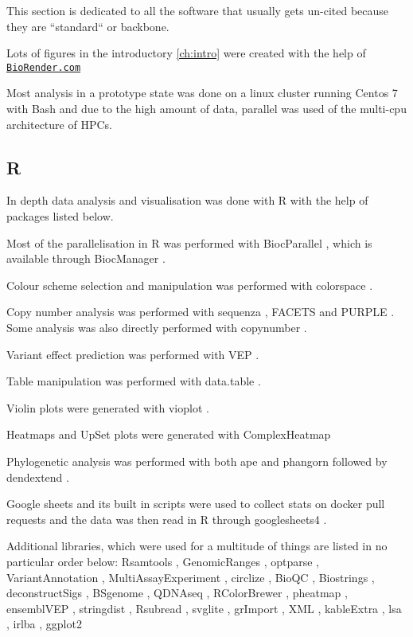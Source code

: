 {This section is dedicated to all the software that usually gets un-cited because they are ``standard`` or backbone.

Lots of figures in the introductory \autoref{ch:intro} were created with the help of \href{https://BioRender.com}{\nolinkurl{BioRender.com}} 


Most analysis in a prototype state was done on a linux cluster running Centos 7 \cite{CentosProject2014} with Bash \cite{FSF2007} and due to the high amount of data, parallel \cite{Tange2011} was used of the multi-cpu architecture of HPCs.

\subsection*{R}
In depth data analysis and visualisation was done with R \cite{RCT2021} with the help of packages listed below.


Most of the parallelisation in R was performed with BiocParallel \cite{Morgan2020}, which is available through BiocManager \cite{Morgan2019}.

Colour scheme selection and manipulation was performed with colorspace \cite{Zeileis2009,Zeileis2020}.

Copy number analysis was performed with sequenza \cite{Favero2015}, FACETS \cite{Shen2016,Seshan2018} and PURPLE \cite{Cameron2019a}. Some analysis was also directly performed with copynumber \cite{Nilsen2012,Nilsen2021}.

Variant effect prediction was performed with VEP \cite{McLaren2016}.

Table manipulation was performed with data.table \cite{Dowle2021}.

Violin plots were generated with vioplot \cite{Adler2020}.

Heatmaps and UpSet plots were generated with ComplexHeatmap \cite{Gu2016}

Phylogenetic analysis was performed with both ape \cite{Paradis2018} and phangorn \cite{Schliep2017} followed by dendextend \cite{Galili2015}.

Google sheets and its built in scripts were used to collect stats on docker pull requests and the data was then read in R through googlesheets4 \cite{Bryan2021}.

Additional libraries, which were used for a multitude of things are listed in no particular order below: Rsamtools \cite{Morgan2021}, GenomicRanges \cite{Lawrence2013}, optparse \cite{Davis2020}, VariantAnnotation \cite{Obenchain2014}, MultiAssayExperiment \cite{Ramos2017}, circlize \cite{Gu2014}, BioQC \cite{Zhang2017}, Biostrings \cite{Pages2020}, deconstructSigs \cite{Rosenthal2016}, BSgenome \cite{Pages2020a}, QDNAseq \cite{Scheinin2014}, RColorBrewer \cite{Neuwirth2014}, pheatmap \cite{Kolde2019}, ensemblVEP \cite{Obenchain2020}, stringdist \cite{vanderLoo2014}, Rsubread \cite{Liao2019}, svglite \cite{Wickham2021}, grImport \cite{Murrell2009}, XML \cite{TempleLang2020}, kableExtra \cite{Zhu2021}, lsa \cite{Wild2020}, irlba \cite{Baglama2019}, ggplot2 \cite{Wickham2016}


}
